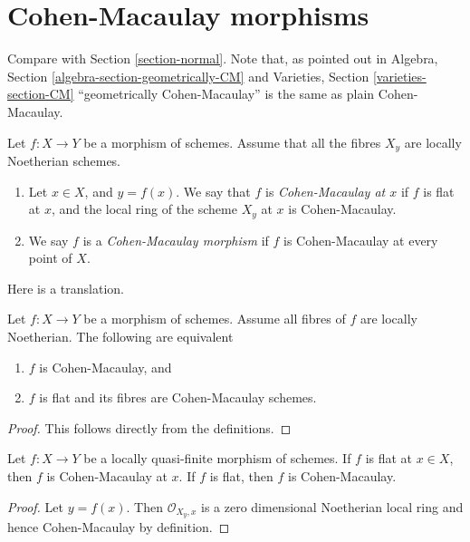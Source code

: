\section{Cohen-Macaulay morphisms}
\label{section-CM}

\noindent
Compare with Section \ref{section-normal}.
Note that, as pointed out in
Algebra, Section \ref{algebra-section-geometrically-CM}
and
Varieties, Section \ref{varieties-section-CM}
``geometrically Cohen-Macaulay'' is the same as plain Cohen-Macaulay.

\begin{definition}
\label{definition-CM}
Let $f : X \to Y$ be a morphism of schemes.
Assume that all the fibres $X_y$ are locally Noetherian schemes.
\begin{enumerate}
\item Let $x \in X$, and $y = f(x)$. We say that $f$ is
{\it Cohen-Macaulay at $x$} if $f$ is flat at $x$, and the
local ring of the scheme $X_y$ at $x$ is Cohen-Macaulay.
\item We say $f$ is a {\it Cohen-Macaulay morphism} if $f$ is
Cohen-Macaulay at every point of $X$.
\end{enumerate}
\end{definition}

\noindent
Here is a translation.

\begin{lemma}
\label{lemma-CM}
Let $f : X \to Y$ be a morphism of schemes.
Assume all fibres of $f$ are locally Noetherian.
The following are equivalent
\begin{enumerate}
\item $f$ is Cohen-Macaulay, and
\item $f$ is flat and its fibres are Cohen-Macaulay schemes.
\end{enumerate}
\end{lemma}

\begin{proof}
This follows directly from the definitions.
\end{proof}

\begin{lemma}
\label{lemma-quasi-finite-flat-CM}
Let $f : X \to Y$ be a locally quasi-finite morphism of schemes.
If $f$ is flat at $x \in X$, then $f$ is Cohen-Macaulay at $x$.
If $f$ is flat, then $f$ is Cohen-Macaulay.
\end{lemma}

\begin{proof}
Let $y = f(x)$. Then $\mathcal{O}_{X_y, x}$
is a zero dimensional Noetherian local ring
and hence Cohen-Macaulay by definition.
\end{proof}

